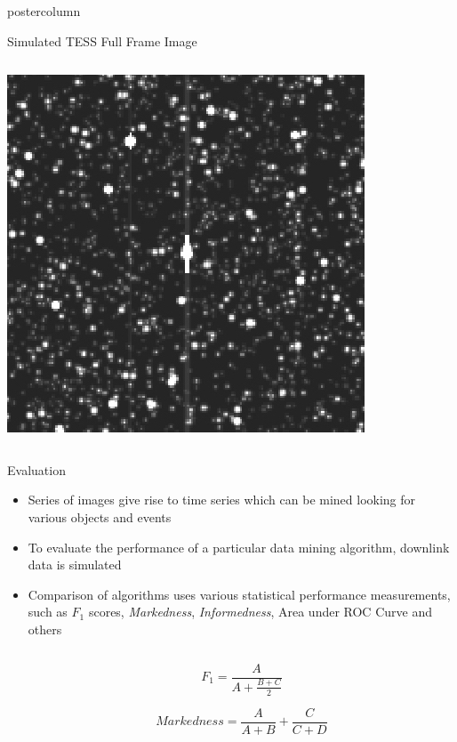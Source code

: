 \documentclass[final,hyperref={pdfpagelabels=false}]{beamer}
\begin{document}
\begin{frame}
\begin{columns}
\begin{column}{.49\textwidth}
\begin{beamercolorbox}[center,wd=\textwidth]{postercolumn}
\begin{minipage}[T]{.95\textwidth}
{\begin{block}{Simulated TESS Full Frame Image}
\begin{columns}
\begin{column}{.38\textwidth}
                  \includegraphics[width=0.80\linewidth]{figures/ffi_simulation.jpg}
		\end{column}
	       \end{columns}
            \end{block}
            \vspace{1cm}
            \begin{block}{Evaluation}
            	\begin{itemize}
			\item Series of images give rise to time series which can be mined looking for various objects and events
			\item To evaluate the performance of a particular data mining algorithm, downlink data is simulated 
			\item Comparison of algorithms uses various statistical performance measurements, such as $F_1$ scores, \emph{Markedness}, \emph{Informedness}, Area under ROC Curve and others
				\begin{columns}
                			\begin{column}{.60\textwidth}
			        $$ F_1 = \frac{A}{A + \frac{B + C}{2}} $$
			       
			       $$ Markedness = \frac{A}{A + B} + \frac{C}{C+D}$$
			       

\end{column}
\end{columns}
\end{itemize}
\end{block}}
\end{minipage}
\end{beamercolorbox}
\end{column}
\end{columns}
\end{frame}
\end{document}

